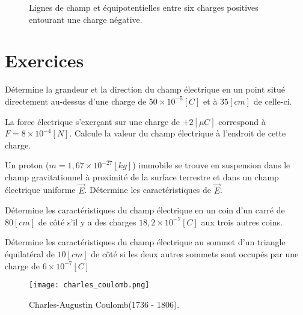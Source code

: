 \begin{figure}[!ht]
    \centering
    \caption{Lignes de champ et équipotentielles entre six charges positives entourant une charge négative.}
    \label{six_charges}
\end{figure}


\newpage

\section{Exercices}
\begin{exercise}
    Détermine la grandeur et la direction du champ électrique en un point situé directement au-dessus d'une charge de \(50 \times 10^{-5}[C]\) et à \(35[cm]\) de celle-ci.
\end{exercise}

\begin{exercise}
    La force électrique s'exerçant sur une charge de \(+2 [\mu C]\) correspond à \(F=8 \times 10^{-4}[N]\). Calcule la valeur du champ électrique à l'endroit de cette charge.
\end{exercise}

\begin{exercise}
    Un proton (\(m=1,67 \times 10^{-27}[kg]\)) immobile se trouve en suspension dans le champ gravitationnel à proximité de la surface terrestre et dans un champ électrique uniforme \(\vec{E}\). Détermine les caractéristiques de \(\vec{E}\).
\end{exercise}

\begin{exercise}
    Détermine les caractéristiques du champ électrique en un coin d'un carré de \(80[cm]\) de côté s'il y a des charges \(18,2 \times 10^{-7}[C]\) aux trois autres coins.
\end{exercise}

\begin{exercise}
    Détermine les caractéristiques du champ électrique au sommet d'un triangle équilatéral de \(10[cm]\) de côté si les deux autres sommets sont occupés par une charge de \(6 \times 10^{-7}[C]\)
\end{exercise}

\begin{figure}[!ht]
    \centering
    \texttt{[image: charles\_coulomb.png]}
    \caption{Charles-Augustin Coulomb(1736 - 1806).}
    \label{charles_coulomb}
\end{figure}
